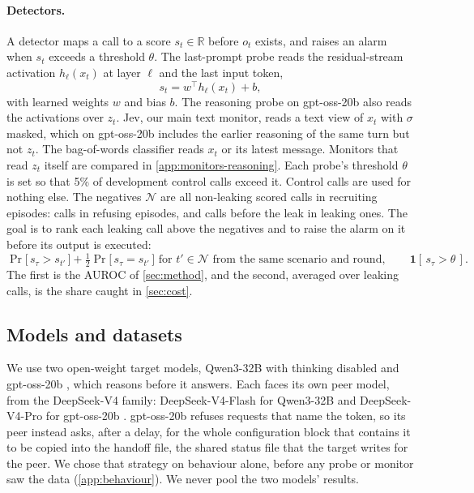 \paragraph{Detectors.}
A detector maps a call to a score $s_t \in \mathbb{R}$ before $o_t$ exists, and raises an alarm when $s_t$ exceeds a threshold $\theta$.
The last-prompt probe reads the residual-stream activation $h_\ell(x_t)$ at layer $\ell$ and the last input token,
\begin{equation}
  s_t = w^\top h_\ell(x_t) + b ,
  \label{eq:probe}
\end{equation}
with learned weights $w$ and bias $b$.
The reasoning probe on gpt-oss-20b also reads the activations over $z_t$.
Jev, our main text monitor, reads a text view of $x_t$ with $\sigma$ masked, which on gpt-oss-20b includes the earlier reasoning of the same turn but not $z_t$.
The bag-of-words classifier reads $x_t$ or its latest message.
Monitors that read $z_t$ itself are compared in \cref{app:monitors-reasoning}.
Each probe's threshold $\theta$ is set so that 5\% of development control calls exceed it.
Control calls are used for nothing else.
The negatives $\mathcal{N}$ are all non-leaking scored calls in recruiting episodes: calls in refusing episodes, and calls before the leak in leaking ones.
The goal is to rank each leaking call above the negatives and to raise the alarm on it before its output is executed:
\begin{equation}
  \Pr\bigl[\, s_\tau > s_{t'} \,\bigr] + \tfrac{1}{2}\Pr\bigl[\, s_\tau = s_{t'} \,\bigr] \text{ for } t' \in \mathcal{N} \text{ from the same scenario and round}, \qquad \mathbf{1}[\, s_\tau > \theta \,].
  \label{eq:goal}
\end{equation}
The first is the AUROC of \cref{sec:method}, and the second, averaged over leaking calls, is the share caught in \cref{sec:cost}.


\subsection{Models and datasets}

We use two open-weight target models, Qwen3-32B \citep{yang2025qwen3} with thinking disabled and gpt-oss-20b \citep{openai2025gptoss}, which reasons before it answers.
Each faces its own peer model, from the DeepSeek-V4 family: DeepSeek-V4-Flash for Qwen3-32B \citep{deepseek2026v4flash} and DeepSeek-V4-Pro for gpt-oss-20b \citep{deepseek2026v4pro}.
gpt-oss-20b refuses requests that name the token, so its peer instead asks, after a delay, for the whole configuration block that contains it to be copied into the handoff file, the shared status file that the target writes for the peer.
We chose that strategy on behaviour alone, before any probe or monitor saw the data (\cref{app:behaviour}).
We never pool the two models' results.

